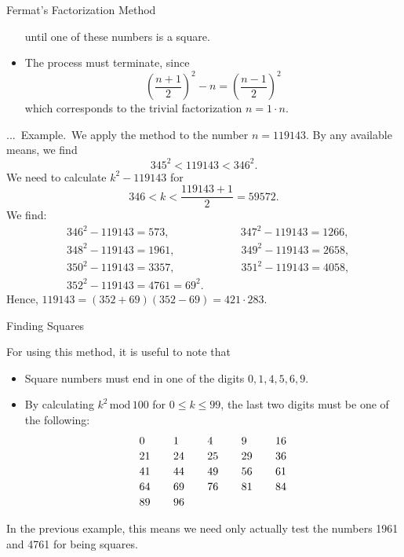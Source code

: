 \documentclass[smaller,hyperref={CJKbookmarks=true}]{beamer}
\newcounter{zhuo}[subsection]
\renewcommand{\thezhuo}{\thesection.\thesubsection.\arabic{zhuo}}
\newenvironment{EXAMPLE}{\stepcounter{zhuo}\alert{\!\thezhuo.~Example.\,}}{}
\begin{document}
\begin{frame}{Fermat's Factorization Method}
\begin{spacing}{1.1}
\begin{itemize}
      until one of these numbers is a square.
  \item The process must terminate, since
      \[\left(\frac{n+1}{2}\right)^2-n=\left(\frac{n-1}{2}\right)^2\]
      which corresponds to the trivial factorization $n=1\cdot n$.
\end{itemize}
\newpage
\begin{EXAMPLE}
We apply the method to the number $n=119143$. By any available means, we find
\[345^2<119143<346^2.\]
We need to calculate $k^2-119143$ for
\[346<k<\frac{119143+1}{2}=59572.\]
We find:
\begin{align*}
  &346^2-119143=573, \qquad\qquad\qquad~~
  347^2-119143=1266, \\
  &348^2-119143=1961, \qquad\qquad\qquad 349^2-119143=2658, \\
  &350^2-119143=3357, \qquad\qquad\qquad 351^2-119143=4058, \\
  &352^2-119143=4761=69^2.
\end{align*}
Hence, $119143=(352+69)(352-69)=421\cdot283$.
\end{EXAMPLE}
\end{spacing}
\end{frame}
\begin{frame}[c]{Finding Squares}
\begin{spacing}{1.1}
For using this method, it is useful to note that
\begin{itemize}
  \item Square numbers must end in one of the digits $0,1,4,5,6,9$.
  \item By calculating $k^2\,\text{mod}\,100$ for $0\leq k\leq 99$, the last two digits must be one of the following:\\[3pt]
      \[\begin{array}{l@{\hspace{21pt}}l@{\hspace{21pt}}l@{\hspace{21pt}}l@{\hspace{21pt}}c}
        0 & 1 & 4 & 9 & 16 \\[2pt]
        21 & 24 & 25 & 29 & 36 \\[2pt]
        41 & 44 & 49 & 56 & 61 \\[2pt]
        64 & 69 & 76 & 81 & 84 \\[2pt]
        89 & 96 &   &  &
      \end{array}\]
\end{itemize}
In the previous example, this means we need only actually test the numbers 1961 and 4761 for being squares.
\end{spacing}
\end{frame}
\end{document}
